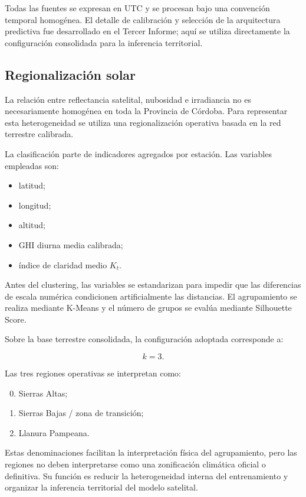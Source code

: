 \documentclass[11pt,a4paper]{article}
\begin{document}
Todas las fuentes se expresan en UTC y se procesan bajo una convención temporal homogénea. El detalle de calibración y selección de la arquitectura predictiva fue desarrollado en el Tercer Informe; aquí se utiliza directamente la configuración consolidada para la inferencia territorial.

\subsection{Regionalización solar}

La relación entre reflectancia satelital, nubosidad e irradiancia no es necesariamente homogénea en toda la Provincia de Córdoba. Para representar esta heterogeneidad se utiliza una regionalización operativa basada en la red terrestre calibrada.

La clasificación parte de indicadores agregados por estación. Las variables empleadas son:

\begin{itemize}
    \item latitud;
    \item longitud;
    \item altitud;
    \item GHI diurna media calibrada;
    \item índice de claridad medio $K_t$.
\end{itemize}

Antes del clustering, las variables se estandarizan para impedir que las diferencias de escala numérica condicionen artificialmente las distancias. El agrupamiento se realiza mediante K-Means y el número de grupos se evalúa mediante Silhouette Score.

Sobre la base terrestre consolidada, la configuración adoptada corresponde a:

\[
k=3.
\]

Las tres regiones operativas se interpretan como:

\begin{enumerate}[label=R\arabic*:]
    \setcounter{enumi}{-1}
    \item Sierras Altas;
    \item Sierras Bajas / zona de transición;
    \item Llanura Pampeana.
\end{enumerate}

Estas denominaciones facilitan la interpretación física del agrupamiento, pero las regiones no deben interpretarse como una zonificación climática oficial o definitiva. Su función es reducir la heterogeneidad interna del entrenamiento y organizar la inferencia territorial del modelo satelital.
\end{document}
